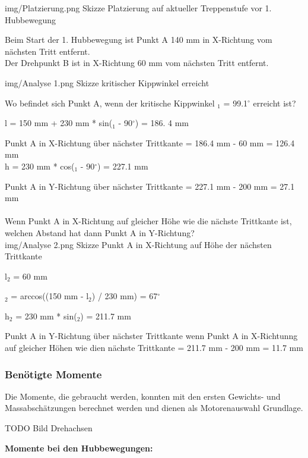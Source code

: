\image
 {img/Platzierung.png}
 {Skizze Platzierung auf aktueller Treppenstufe vor 1. Hubbewegung}

Beim Start der 1. Hubbewegung ist Punkt A 140 mm in X-Richtung vom nächsten Tritt entfernt.\\

Der Drehpunkt B ist in X-Richtung 60 mm vom nächsten Tritt entfernt.

\image
 {img/Analyse 1.png}
 {Skizze kritischer Kippwinkel erreicht}

Wo befindet sich Punkt A, wenn der kritische Kippwinkel \alpha$_{1}$ = 99.1$^\circ$ erreicht ist?

l = 150 mm + 230 mm * sin(\alpha$_{1}$ - 90$^\circ$) = 186. 4 mm

Punkt A in X-Richtung über nächster Trittkante = 186.4 mm - 60 mm = 126.4 mm\\

h = 230 mm * cos(\alpha$_{1}$ - 90$^\circ$) = 227.1 mm

Punkt A in Y-Richtung über nächster Trittkante = 227.1 mm - 200 mm = 27.1 mm\\
\\

Wenn Punkt A in X-Richtung auf gleicher Höhe wie die nächste Trittkante ist, welchen Abstand hat dann Punkt A in Y-Richtung?\\

\image
 {img/Analyse 2.png}
 {Skizze Punkt A in X-Richtung auf Höhe der nächsten Trittkante}

l$_{2}$ = 60 mm

\alpha$_{2}$ = arccos((150 mm - l$_{2}$) / 230 mm) = 67$^\circ$

h$_{2}$ = 230 mm * sin(\alpha$_{2}$)  = 211.7 mm

Punkt A in Y-Richtung über nächster Trittkante wenn Punkt A in X-Richtunng auf gleicher Höhen wie dien nächste Trittkante = 211.7 mm - 200 mm = 11.7 mm\\


\subsubsection{Benötigte Momente}

Die Momente, die gebraucht werden, konnten mit den ersten Gewichts- und Massabschätzungen berechnet werden und dienen als Motorenauswahl Grundlage.

TODO Bild Drehachsen

\textbf{Momente bei den Hubbewegungen:}

